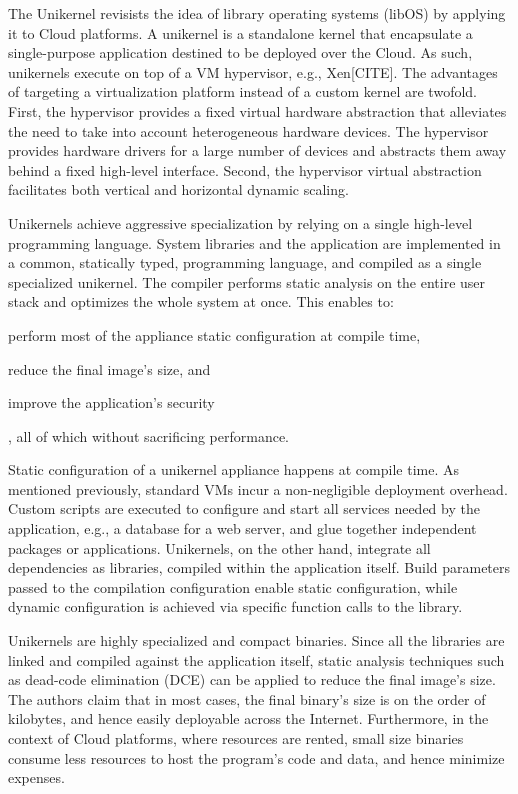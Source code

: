 The Unikernel revisists the idea of library operating systems (libOS) by applying it to Cloud platforms.
A unikernel is a standalone kernel that encapsulate a single-purpose application destined to be deployed over the Cloud.
As such, unikernels execute on top of a VM hypervisor, e.g., Xen[CITE].
The advantages of targeting a virtualization platform instead of a custom kernel are twofold.
First, the hypervisor provides a fixed virtual hardware abstraction that alleviates the need to take into account heterogeneous hardware devices.
The hypervisor provides hardware drivers for a large number of devices and abstracts them away behind a fixed high-level interface.
Second, the hypervisor virtual abstraction facilitates both vertical and horizontal dynamic scaling.


Unikernels achieve aggressive specialization by relying on a single high-level programming language.
System libraries and the application are implemented in a common, statically typed, programming language, and compiled as a single specialized unikernel.
The compiler performs static analysis on the entire user stack and optimizes the whole system at once.
This enables to:
\begin{enumerate*}
	\item perform most of the appliance static configuration at compile time,
	\item reduce the final image's size, and
	\item improve the application's security
\end{enumerate*}, all of which without sacrificing performance.

Static configuration of a unikernel appliance happens at compile time.
As mentioned previously, standard VMs incur a non-negligible deployment overhead.
Custom scripts are executed to configure and start all services needed by the application, e.g., a database for a web server, and glue together independent packages or applications.
Unikernels, on the other hand, integrate all dependencies as libraries, compiled within the application itself.
Build parameters passed to the compilation configuration enable static configuration, while dynamic configuration is achieved via specific function calls to the library.

Unikernels are highly specialized and compact binaries.
Since all the libraries are linked and compiled against the application itself, static analysis techniques such as dead-code elimination (DCE) can be applied to reduce the final image's size.
The authors claim that in most cases, the final binary's size is on the order of kilobytes, and hence easily deployable across the Internet.
Furthermore, in the context of Cloud platforms, where resources are rented, small size binaries consume less resources to host the program's code and data, and hence minimize expenses.

